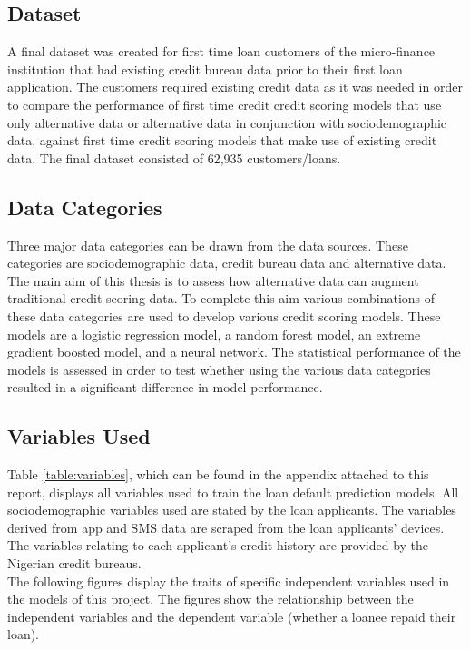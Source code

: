 \subsection{Dataset}

A final dataset was created for first time loan customers of the micro-finance institution that had existing credit bureau data prior to their first loan application. The customers required existing credit data as it was needed in order to compare the performance of first time credit credit scoring models that use only alternative data or alternative data in conjunction with sociodemographic data, against first time credit scoring models that make use of existing credit data. The final dataset consisted of 62,935 customers/loans. \newpage

\subsection{Data Categories}

Three major data categories can be drawn from the data sources. These categories are sociodemographic data, credit bureau data and alternative data. The main aim of this thesis is to assess how alternative data can augment traditional credit scoring data. To complete this aim various combinations of these data categories are used to develop various credit scoring models. These models are a logistic regression model, a random forest model, an extreme gradient boosted model, and a neural network. The statistical performance of the models is assessed in order to test whether using the various data categories resulted in a significant difference in model performance. 

\subsection{Variables Used}

Table \ref{table:variables}, which can be found in the appendix attached to this report, displays all variables used to train the loan default prediction models. All sociodemographic variables used are stated by the loan applicants. The variables derived from app and SMS data are scraped from the loan applicants' devices. The variables relating to each applicant's credit history are provided by the Nigerian credit bureaus. \\

The following figures display the traits of specific independent variables used in the models of this project. The figures show the relationship between the independent variables and the dependent variable (whether a loanee repaid their loan).  

